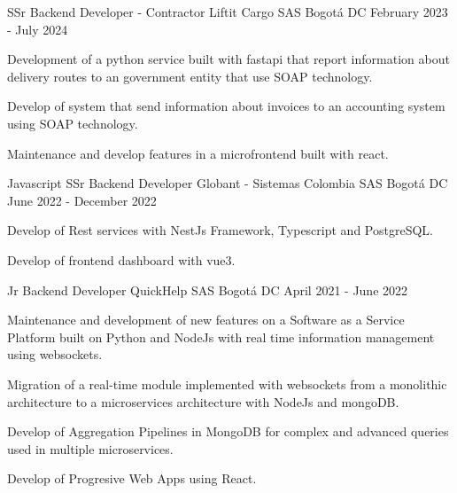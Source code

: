 \begin{cventries}
    \cventry
    {SSr Backend Developer - Contractor} %
    {Liftit Cargo SAS} %
    {Bogotá DC} %
    {February 2023 - July 2024} %
    {
      \begin{cvitems} %
        \item {Development of a python service built with fastapi that report information about delivery routes to an government entity that use SOAP technology.}
        \item {Develop of system that send information about invoices to an accounting system using SOAP technology.}
        \item {Maintenance and develop features in a microfrontend built with react.}
      \end{cvitems}
    }

  \cventry
    {Javascript SSr Backend Developer} %
    {Globant - Sistemas Colombia SAS} %
    {Bogotá DC} %
    {June 2022 - December 2022} %
    {
      \begin{cvitems} %
        \item {Develop of Rest services with NestJs Framework, Typescript and PostgreSQL.}
        \item {Develop of frontend dashboard with vue3.}
      \end{cvitems}
    }
    
  \cventry
    {Jr Backend Developer} %
    {QuickHelp SAS} %
    {Bogotá DC} %
    {April 2021 - June 2022} %
    {
      \begin{cvitems} %
        \item {Maintenance and development of new features on a Software as a Service Platform built on Python and NodeJs with real time information management using websockets.}
        \item {Migration of a real-time module implemented with websockets from a monolithic architecture to a microservices architecture with NodeJs and mongoDB.}
        \item {Develop of Aggregation Pipelines in MongoDB for complex and advanced queries used in multiple microservices.}
        \item {Develop of Progresive Web Apps using React.}
      \end{cvitems}
    }

\end{cventries}
